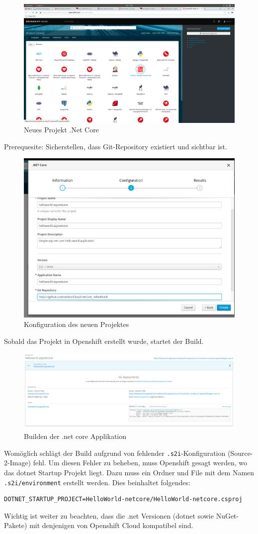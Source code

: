 \documentclass[12pt,a4paper]{article}
\begin{document}
\begin{figure}
	\centering
	\includegraphics[width=0.7\linewidth]{img/os-new-dotnet}
	\caption{Neues Projekt .Net Core}
	\label{fig:os-new-dotnet}
\end{figure}
Prerequesite: Sicherstellen, dass Git-Repository existiert und sichtbar ist.

\begin{figure}[h]
	\centering
	\includegraphics[width=0.7\linewidth]{img/os-new-config}
	\caption{Konfiguration des neuen Projektes}
	\label{fig:os-new-config}
\end{figure}

Sobald das Projekt in Openshift erstellt wurde, startet der Build. 
\begin{figure}[h]
	\centering
	\includegraphics[width=0.7\linewidth]{img/os-building}
	\caption{Builden der .net core Applikation}
	\label{fig:os-building}
\end{figure}
Womöglich schlägt der Build aufgrund von fehlender \texttt{.s2i}-Konfiguration (Source-2-Image) fehl. Um diesen Fehler zu beheben, muss Openshift gesagt werden, wo das dotnet Startup Projekt liegt. Dazu muss ein Ordner und File mit dem Namen \texttt{.s2i/environment} erstellt werden. Dies beinhaltet folgendes:
\begin{lstlisting}[breaklines=true]
DOTNET_STARTUP_PROJECT=HelloWorld-netcore/HelloWorld-netcore.csproj
\end{lstlisting}
Wichtig ist weiter zu beachten, dass die .net Versionen (dotnet sowie NuGet-Pakete) mit denjenigen von Openshift Cloud kompatibel sind. 
\end{document}
